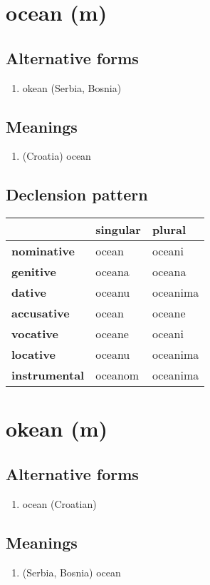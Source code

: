 \filbreak
\section{ocean (m)}
\subsection*{Alternative forms}
\begin{enumerate}
\item okean (Serbia, Bosnia)
\end{enumerate}
\subsection*{Meanings}
\begin{enumerate}
\item (Croatia) ocean
\end{enumerate}
\subsection*{Declension pattern}
\begin{tabularx}{\linewidth}{Xll}
\toprule
{} & singular &    plural \\
\midrule
\textbf{nominative  } &    ocean &    oceani \\
\textbf{genitive    } &   oceana &    oceana \\
\textbf{dative      } &   oceanu &  oceanima \\
\textbf{accusative  } &    ocean &    oceane \\
\textbf{vocative    } &   oceane &    oceani \\
\textbf{locative    } &   oceanu &  oceanima \\
\textbf{instrumental} &  oceanom &  oceanima \\
\bottomrule
\end{tabularx}

\filbreak
\section{okean (m)}
\subsection*{Alternative forms}
\begin{enumerate}
\item ocean (Croatian)
\end{enumerate}
\subsection*{Meanings}
\begin{enumerate}
\item (Serbia, Bosnia) ocean
\end{enumerate}
